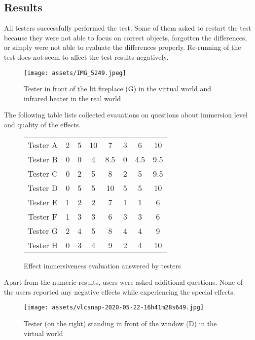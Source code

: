 \hypertarget{x-results}{\subsection{Results}}
All testers successfully performed the test. Some of them asked to
restart the test because they were not able to focus on correct objects,
forgotten the differences, or simply were not able to evaluate the
differences properly. Re-running of the test does not seem to affect the
test results negatively.


\begin{figure}[h]{}
\centering\texttt{[image: assets/IMG\_5249.jpeg]}
\caption{Tester in front of the lit fireplace (G) in the virtual world and infrared heater in the real world}

\end{figure}

The following table lists collected evauations on questions about immersion level and
quality of the effects.

\begin{figure}
    \begin{center}
    \begin{tabular}{|c|c|c|c|c|c|c|c|}
    \hline
    Tester A & 2 & 5 & 10 & 7 & 3 & 6 & 10 \\ 
    Tester B & 0 & 0 & 4 & 8.5 & 0 & 4.5 & 9.5 \\ 
    Tester C & 0 & 2 & 5 & 8 & 2 & 5 & 9.5 \\ 
    Tester D & 0 & 5 & 5 & 10 & 5 & 5 & 10 \\ 
    Tester E & 1 & 2 & 2 & 7 & 1 & 1 & 6 \\ 
    Tester F & 1 & 3 & 3 & 6 & 3 & 3 & 6 \\ 
    Tester G & 2 & 4 & 5 & 8 & 4 & 4 & 9 \\ 
    Tester H & 0 & 3 & 4 & 9 & 2 & 4 & 10 \\ 
    \hline
    \end{tabular}
    \caption{Effect immersiveness evaluation answered by testers}
    \end{center}
\end{figure}

Apart from the numeric results, users were asked additional questions.
None of the users reported any negative effects while experiencing the special
effects.


\begin{figure}[h]{}
\centering\texttt{[image: assets/vlcsnap-2020-05-22-16h41m28s649.jpg]}
\caption{Tester (on the right) standing in front of the window (D) in the virtual world}

\end{figure}

